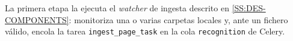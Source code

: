 La primera etapa la ejecuta el \textit{watcher} de ingesta descrito en
\cref{SS:DES-COMPONENTS}: monitoriza una o varias carpetas locales y, ante
un fichero válido, encola la tarea \texttt{ingest\_page\_task} en la cola
\texttt{recognition} de Celery.
